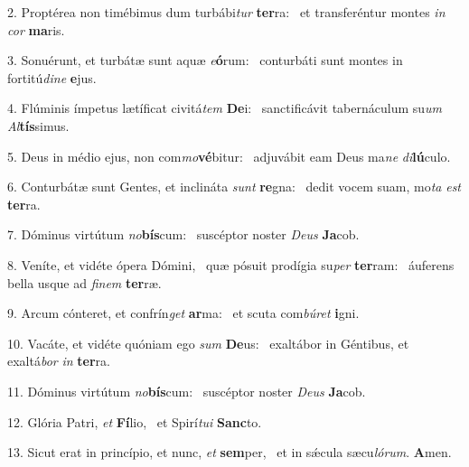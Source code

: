 2. Proptérea non timébimus dum turbábi\textit{tur} \textbf{ter}ra: \ast\  et transferéntur montes \textit{in} \textit{cor} \textbf{ma}ris.\

3. Sonuérunt, et turbátæ sunt aquæ \textit{e}\textbf{ó}rum: \ast\  conturbáti sunt montes in fortitú\textit{di}\textit{ne} \textbf{e}jus.\

4. Flúminis ímpetus lætíficat civitá\textit{tem} \textbf{De}i: \ast\  sanctificávit tabernáculum su\textit{um} \textit{Al}\textbf{tís}simus.\

5. Deus in médio ejus, non com\textit{mo}\textbf{vé}bitur: \ast\  adjuvábit eam Deus ma\textit{ne} \textit{di}\textbf{lú}culo.\

6. Conturbátæ sunt Gentes, et inclináta \textit{sunt} \textbf{re}gna: \ast\  dedit vocem suam, mo\textit{ta} \textit{est} \textbf{ter}ra.\

7. Dóminus virtútum \textit{no}\textbf{bís}cum: \ast\  suscéptor noster \textit{De}\textit{us} \textbf{Ja}cob.\

8. Veníte, et vidéte ópera Dómini, \dag\  quæ pósuit prodígia su\textit{per} \textbf{ter}ram: \ast\  áuferens bella usque ad \textit{fi}\textit{nem} \textbf{ter}ræ.\

9. Arcum cónteret, et confrín\textit{get} \textbf{ar}ma: \ast\  et scuta com\textit{bú}\textit{ret} \textbf{i}gni.\

10. Vacáte, et vidéte quóniam ego \textit{sum} \textbf{De}us: \ast\  exaltábor in Géntibus, et exaltá\textit{bor} \textit{in} \textbf{ter}ra.\

11. Dóminus virtútum \textit{no}\textbf{bís}cum: \ast\  suscéptor noster \textit{De}\textit{us} \textbf{Ja}cob.\

12. Glória Patri, \textit{et} \textbf{Fí}lio, \ast\  et Spirí\textit{tu}\textit{i} \textbf{Sanc}to.\

13. Sicut erat in princípio, et nunc, \textit{et} \textbf{sem}per, \ast\  et in sǽcula sæcu\textit{ló}\textit{rum}. \textbf{A}men.\


